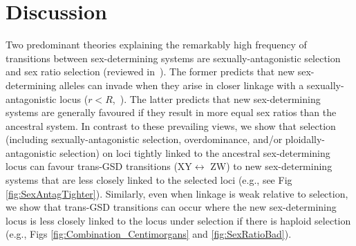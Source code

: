 \documentclass[10pt,letterpaper]{article}
\providecommand{\DIFadd}[1]{{\protect\color{blue}\uwave{#1}}} %
\providecommand{\DIFaddbegin}{} %
\providecommand{\DIFaddend}{} %
\begin{document}
\section*{Discussion}


Two predominant theories explaining the remarkably high frequency of transitions between \DIFaddbegin \DIFadd{genetic }\DIFaddend sex-determining systems are sexually-antagonistic selection and sex ratio selection (reviewed in~\cite{Blaser2012, vanDoorn2014re}).
The former predicts that new sex-determining alleles can invade when they arise in closer linkage with a sexually-antagonistic locus ($r<R$,~\cite{vanDoorn:2007eu,vanDoorn:2010hu, Muralidhar2018}).
The latter predicts that new sex-determining systems are generally favoured if they result in more equal sex ratios than the ancestral system. 
In contrast to these prevailing views, we show that selection (including sexually-antagonistic selection, overdominance, and/or ploidally-antagonistic selection) on loci tightly linked to the ancestral sex-determining locus can favour trans-GSD transitions (XY$\leftrightarrow$ ZW) to new sex-determining systems that are less closely linked to the selected loci (e.g., see Fig \ref{fig:SexAntagTighter}). 
Similarly, even when linkage is weak relative to selection, we show that %
trans-GSD transitions can occur where the new sex-determining locus is less closely linked to the locus under selection if there is haploid selection (e.g., Figs \ref{fig:Combination_Centimorgans} and \ref{fig:SexRatioBad}). 
\end{document}
